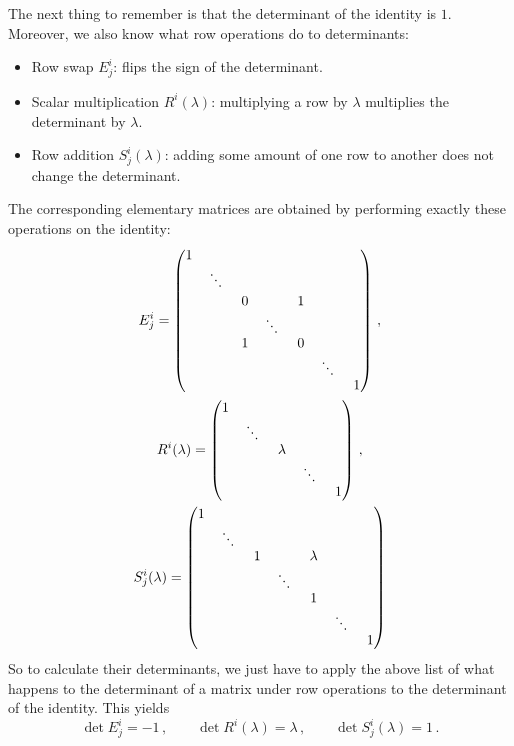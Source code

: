 {The next thing to remember is that the determinant of the identity is $1$.
Moreover, we also know what row operations do to determinants:
\begin{itemize} 
\item Row swap $E^i_j$: flips the sign of the determinant.
\item Scalar multiplication $R^i(\lambda)$: multiplying a row by $\lambda$ multiplies the determinant by $\lambda$.
\item Row addition $S^i_j(\lambda)$: adding some amount of one row to another does not change the determinant.
\end{itemize}
The corresponding elementary matrices are obtained by performing exactly these operations on the identity:
\begin{gather*}
E^i_j=\begin{pmatrix}
1 & & & & & & \\
& \rotatebox{-15}{$\ddots$} & & & & & \\[1mm]
& & 0 & & 1 & & \\
& & & \rotatebox{-15}{$\ddots$} & & & \\
& & 1 & & 0 & & \\
& & & & & \rotatebox{-15}{$\ddots$}& \\
& & & & & & 1 \\
\end{pmatrix}\, ,\\
R^i(\lambda)=
\begin{pmatrix}
1 & & & & \\
  & \rotatebox{-15}{$\ddots$} & & & \\
  & & \lambda & & \\
  & & & \rotatebox{-15}{$\ddots$} & \\
  & & & & 1 \\
\end{pmatrix}
\, ,\\
S^i_j(\lambda) = \begin{pmatrix}
1 & 	& 	& 	& & & 	\\
  & \rotatebox{-15}{$\ddots$} & 	&	& & &	\\
  & 	& 1 	& 	& \lambda & &	\\
  & 	& 	& \rotatebox{-15}{$\ddots$} & & &	\\
  & 	& 	& 	& 1 & & 	\\
  & 	& 	& 	& 	& \rotatebox{-15}{$\ddots$}& 	\\
  & 	& 	& 	& 	& 	 & 1	\\
\end{pmatrix}
\end{gather*}
So to calculate their determinants, we just have to apply the above list of what happens to the determinant of a matrix under row operations to the determinant of the identity. This yields
\[
\det E^i_j=-1\, ,\qquad
\det R^i(\lambda)=\lambda\, ,\qquad
\det S^i_j(\lambda)=1\, .
\]


} %

